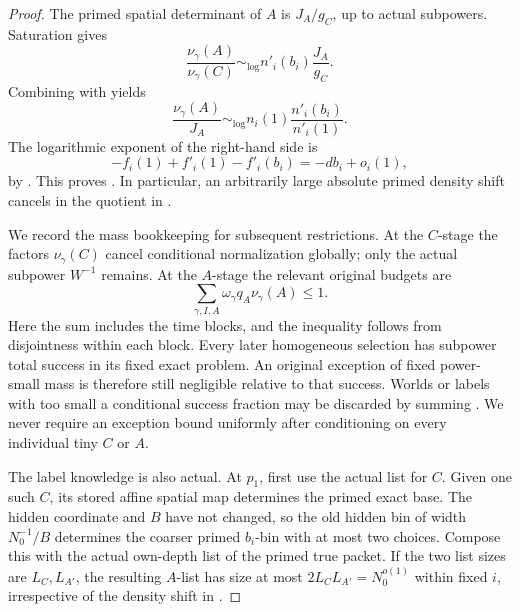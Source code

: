 \begin{proof}
The primed spatial determinant of \(A\) is \(J_A/g_C\), up to actual
subpowers.  Saturation gives
\[
 \frac{\nu_\gamma(A)}{\nu_\gamma(C)}
   \sim_{\log}n'_i(b_i)\frac{J_A}{g_C}.
\]
Combining with  yields
\begin{equation}
 \label{a08:density-ratio}
 \frac{\nu_\gamma(A)}{J_A}
   \sim_{\log}
   n_i(1)\frac{n'_i(b_i)}{n'_i(1)}.
\end{equation}
The logarithmic exponent of the right-hand side is
\[
 -f_i(1)+f'_i(1)-f'_i(b_i)
   =-db_i+o_i(1),
\]
by .  This proves
.  In particular, an arbitrarily large
absolute primed density shift cancels in the quotient in
.

We record the mass bookkeeping for subsequent restrictions.
At the \(C\)-stage the factors \(\nu_\gamma(C)\) cancel conditional
normalization globally; only the actual subpower \(W^{-1}\) remains.
At the \(A\)-stage the relevant original budgets are
\begin{equation}
 \label{a08:A-budget}
 \sum_{\gamma,I,A}\omega_\gamma q_A\nu_\gamma(A)\le1.
\end{equation}
Here the sum includes the time blocks, and the inequality follows
from disjointness within each block.  Every later homogeneous
selection has subpower total success in its fixed exact problem.
An original exception of fixed power-small mass is therefore still
negligible relative to that success.  Worlds or labels with too small
a conditional success fraction may be discarded by summing
.  We never require an exception bound uniformly
after conditioning on every individual tiny \(C\) or \(A\).

The label knowledge is also actual.  At \(p_1\), first use the actual
list for \(C\).  Given one such \(C\), its stored affine spatial map
determines the primed exact base.  The hidden coordinate and \(B\)
have not changed, so the old hidden bin of width \(N_0^{-1}/B\)
determines the coarser primed \(b_i\)-bin with at most two choices.
Compose this with the actual own-depth list of the primed true
packet.  If the two list sizes are \(L_C,L_{A'}\), the resulting
\(A\)-list has size at most \(2L_CL_{A'}=N_0^{o(1)}\) within fixed
\(i\), irrespective of the density shift in
.


\end{proof}
